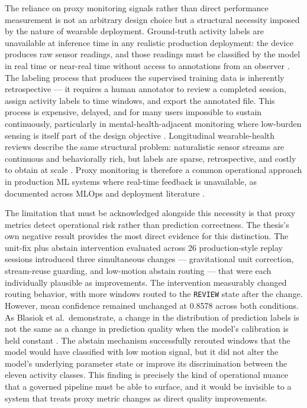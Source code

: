 The reliance on proxy monitoring signals rather than direct performance measurement is not an arbitrary design choice but a structural necessity imposed by the nature of wearable deployment. Ground-truth activity labels are unavailable at inference time in any realistic production deployment: the device produces raw sensor readings, and those readings must be classified by the model in real time or near-real time without access to annotations from an observer \cite{dhekane2024transfer,khattak2023mlhops}. The labeling process that produces the supervised training data is inherently retrospective --- it requires a human annotator to review a completed session, assign activity labels to time windows, and export the annotated file. This process is expensive, delayed, and for many users impossible to sustain continuously, particularly in mental-health-adjacent monitoring where low-burden sensing is itself part of the design objective \cite{abdalrazaq2023wearable,gomes2023mentalhealth,levine2020passivesensing,khattak2023mlhops}. Longitudinal wearable-health reviews describe the same structural problem: naturalistic sensor streams are continuous and behaviorally rich, but labels are sparse, retrospective, and costly to obtain at scale \cite{lago2024longitudinal}. Proxy monitoring is therefore a common operational approach in production ML systems where real-time feedback is unavailable, as documented across MLOps and deployment literature \cite{kreuzberger2023mlops,paleyes2022challenges,hewage2022mlops}.

The limitation that must be acknowledged alongside this necessity is that proxy metrics detect operational risk rather than prediction correctness. The thesis's own negative result provides the most direct evidence for this distinction. The unit-fix plus abstain intervention evaluated across 26 production-style replay sessions introduced three simultaneous changes --- gravitational unit correction, stream-reuse guarding, and low-motion abstain routing --- that were each individually plausible as improvements. The intervention measurably changed routing behavior, with more windows routed to the \texttt{REVIEW} state after the change. However, mean confidence remained unchanged at 0.8578 across both conditions. As Blasiok et al.\ demonstrate, a change in the distribution of prediction labels is not the same as a change in prediction quality when the model's calibration is held constant \cite{blasiok2024calibration}. The abstain mechanism successfully rerouted windows that the model would have classified with low motion signal, but it did not alter the model's underlying parameter state or improve its discrimination between the eleven activity classes. This finding is precisely the kind of operational nuance that a governed pipeline must be able to surface, and it would be invisible to a system that treats proxy metric changes as direct quality improvements.

